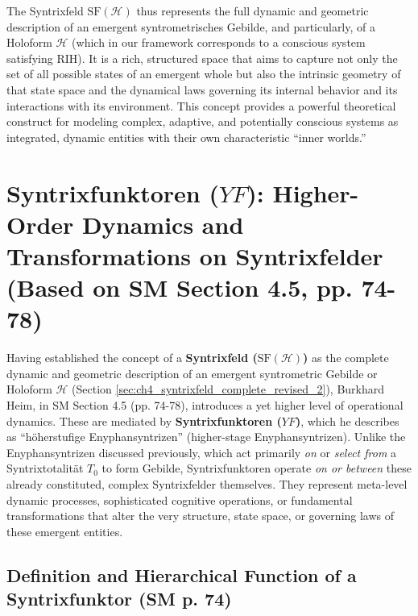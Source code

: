 \documentclass[
    12pt,              %
    a4paper,           %
    headings=normal,   %
    twoside=true,      %
    BCOR=8mm,          %
]{scrbook}
\newcommand{\q}[1]{\enquote{#1}}
\newcommand{\syntrixfunktor}{YF}
\begin{document}
The Syntrixfeld \(\text{SF}(\mathcal{H})\) thus represents the full dynamic and geometric description of an emergent syntrometrisches Gebilde, and particularly, of a Holoform \(\mathcal{H}\) (which in our framework corresponds to a conscious system satisfying RIH). It is a rich, structured space that aims to capture not only the set of all possible states of an emergent whole but also the intrinsic geometry of that state space and the dynamical laws governing its internal behavior and its interactions with its environment. This concept provides a powerful theoretical construct for modeling complex, adaptive, and potentially conscious systems as integrated, dynamic entities with their own characteristic \q{inner worlds.}
\section{Syntrixfunktoren (\(\syntrixfunktor\)): Higher-Order Dynamics and Transformations on Syntrixfelder (Based on SM Section 4.5, pp. 74-78)}
\label{sec:ch4_syntrixfunktoren_overall_revised} 

Having established the concept of a \textbf{Syntrixfeld (\(\text{SF}(\mathcal{H})\))} as the complete dynamic and geometric description of an emergent syntrometric Gebilde or Holoform \(\mathcal{H}\) (Section \ref{sec:ch4_syntrixfeld_complete_revised_2}), Burkhard Heim, in SM Section 4.5 (pp. 74-78), introduces a yet higher level of operational dynamics. These are mediated by \textbf{Syntrixfunktoren (\(\syntrixfunktor\))}, which he describes as \q{höherstufige Enyphansyntrizen} (higher-stage Enyphansyntrizen). Unlike the Enyphansyntrizen discussed previously, which act primarily \textit{on} or \textit{select from} a Syntrixtotalität \(T_0\) to form Gebilde, Syntrixfunktoren operate \textit{on or between} these already constituted, complex Syntrixfelder themselves. They represent meta-level dynamic processes, sophisticated cognitive operations, or fundamental transformations that alter the very structure, state space, or governing laws of these emergent entities.

\subsection{Definition and Hierarchical Function of a Syntrixfunktor (SM p. 74)}
\label{sec:ch4_sf_definition_function_revised_2}
\end{document}
